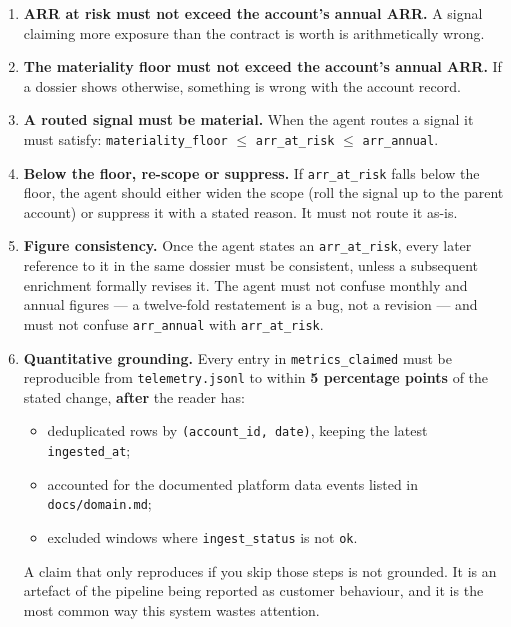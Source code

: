 \documentclass[11pt, a4paper]{article}
\begin{document}
\begin{enumerate}[leftmargin=*, label=\textbf{M\arabic*.}]

\item \textbf{ARR at risk must not exceed the account's annual ARR.} A signal claiming more exposure than the contract is worth is arithmetically wrong.

\item \textbf{The materiality floor must not exceed the account's annual ARR.} If a dossier shows otherwise, something is wrong with the account record.

\item \textbf{A routed signal must be material.} When the agent routes a signal it must satisfy: \texttt{materiality\_floor} $\leq$ \texttt{arr\_at\_risk} $\leq$ \texttt{arr\_annual}.

\item \textbf{Below the floor, re-scope or suppress.} If \texttt{arr\_at\_risk} falls below the floor, the agent should either widen the scope (roll the signal up to the parent account) or suppress it with a stated reason. It must not route it as-is.

\item \textbf{Figure consistency.} Once the agent states an \texttt{arr\_at\_risk}, every later reference to it in the same dossier must be consistent, unless a subsequent enrichment formally revises it. The agent must not confuse monthly and annual figures --- a twelve-fold restatement is a bug, not a revision --- and must not confuse \texttt{arr\_annual} with \texttt{arr\_at\_risk}.

\item \textbf{Quantitative grounding.} Every entry in \texttt{metrics\_claimed} must be reproducible from \texttt{telemetry.jsonl} to within \textbf{5 percentage points} of the stated change, \textbf{after} the reader has:
\begin{itemize}[nosep]
  \item deduplicated rows by \texttt{(account\_id, date)}, keeping the latest \texttt{ingested\_at};
  \item accounted for the documented platform data events listed in \texttt{docs/domain.md};
  \item excluded windows where \texttt{ingest\_status} is not \texttt{ok}.
\end{itemize}
A claim that only reproduces if you skip those steps is not grounded. It is an artefact of the pipeline being reported as customer behaviour, and it is the most common way this system wastes attention.

\end{enumerate}
\end{document}
